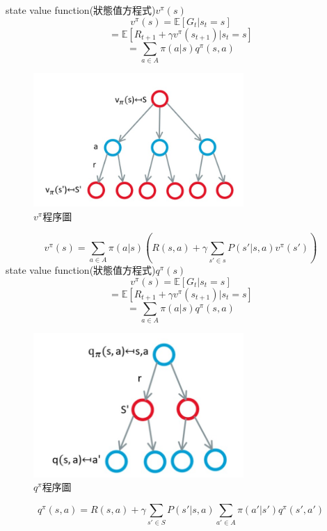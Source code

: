 \documentclass[14pt,a4paper]{report}  %
\begin{document}
state value function(狀態值方程式)$v^{\pi}(s)$\\
$$v^{\pi}(s) = \mathbb{E}[G_t|s_t=s]$$
$$= \mathbb{E}[R_{t+1}+\gamma v^{\pi}(s_{t+1})|s_t=s]$$
$$= \sum_{a\in A}\pi (a|s)q^{\pi}(s, a)$$
\begin{figure}[hbt!]
\begin{center}
\includegraphics[width=8cm]{s_to _s}
\caption{\Large $v^{\pi}$程序圖}
\label{fig.s_to_s}
\end{center}
\end{figure}
$$v^{\pi}(s) = \sum_{a\in A}\pi (a|s)(R(s, a)+\gamma \sum_{s'\in s}P(s'|s, a)v^{\pi}(s'))$$
state value function(狀態值方程式)$q^{\pi}(s)$
$$v^{\pi}(s) = \mathbb{E}[G_t|s_t=s]$$
$$= \mathbb{E}[R_{t+1}+\gamma v^{\pi}(s_{t+1})|s_t=s]$$
$$= \sum_{a\in A}\pi (a|s)q^{\pi}(s, a)$$
\begin{figure}[hbt!]
\begin{center}
\includegraphics[width=8cm]{Q_pi function}
\caption{\Large $q^{\pi}$程序圖}
\label{fig.q_pi}
\end{center}
\end{figure}
$$q^\pi(s, a)=R(s, a)+\gamma\sum_{s'\in S}P(s'|s, a)\sum_{a'\in A}\pi(a'|s')q^{\pi}(s', a')$$
\newpage
\end{document}
